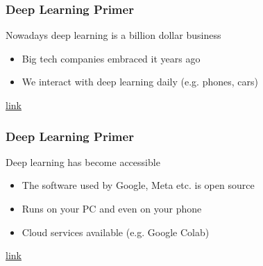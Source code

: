 \documentclass[xetex,professionalfont]{beamer}
\newcommand{\eg}{\mbox{e.g.}\xspace} %
\begin{document}
\begin{frame}
\frametitle{Deep Learning Primer}

Nowadays deep learning is a billion dollar business
\begin{itemize}
    \item Big tech companies embraced it years ago
    \item We interact with deep learning daily (\eg phones, cars) %
\end{itemize}

\medskip

\begin{center}
    {\centering\href{https://www.theverge.com/2022/1/24/22898651/meta-artificial-intelligence-ai-supercomputer-rsc-2022}{link}}
\end{center}

\end{frame}


\begin{frame}
\frametitle{Deep Learning Primer}

Deep learning has become accessible
\begin{itemize}
    \item The software used by Google, Meta etc. is open source
    \item Runs on your PC and even on your phone
    \item Cloud services available (\eg Google Colab) %
\end{itemize}

\medskip

\begin{center}
    {\centering\href{https://pytorch.org/}{link}}
\end{center}

\end{frame}
\end{document}
